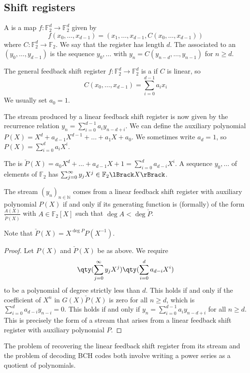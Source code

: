 \subsection{Shift registers}
\begin{definition}
    A  is a map $f \colon \mathbb F_2^d \to \mathbb F_2^d$ given by
    \[ f(x_0, \dots, x_{d-1}) = (x_1, \dots, x_{d-1}, C(x_0, \dots, x_{d-1})) \]
    where $C \colon \mathbb F_2^d \to \mathbb F_2$.
    We say that the register has length $d$.
    The  associated to an  $(y_0, \dots, y_{d-1})$ is the sequence $y_0, \dots$ with $y_n = C(y_{n-d}, \dots, y_{n-1})$ for $n \geq d$.
\end{definition}
\begin{definition}
    The general feedback shift register $f \colon \mathbb F_2^d \to \mathbb F_2^d$ is a  if $C$ is linear, so
    \[ C(x_0, \dots, x_{d-1}) = \sum_{i=0}^{d-1} a_i x_i \]
    We usually set $a_0 = 1$.
\end{definition}
The stream produced by a linear feedback shift register is now given by the recurrence relation $y_n = \sum_{i=0}^{d-1} a_i y_{n-d+i}$.
We can define the auxiliary polynomial $P(X) = X^d + a_{d-1} X^{d-1} + \dots + a_1 X + a_0$.
We sometimes write $a_d = 1$, so $P(X) = \sum_{i=0}^d a_i X^i$.
\begin{definition}
    The  is $\check{P}(X) = a_0 X^d + \dots + a_{d-1} X + 1 = \sum_{i=0}^d a_{d-i} X^i$.
    A sequence $y_0, \dots$ of elements of $\mathbb F_2$ has  $\sum_{j=0}^\infty y_j X^j \in \mathbb F_2\Brackets{X}$.
\end{definition}
\begin{theorem}
    The stream $(y_n)_{n \in \mathbb N}$ comes from a linear feedback shift register with auxiliary polynomial $P(X)$ if and only if its generating function is (formally) of the form $\frac{A(X)}{\check{P}(X)}$ with $A \in \mathbb F_2[X]$ such that $\deg A < \deg \check{P}$.
\end{theorem}
Note that $\check{P}(X) = X^{\deg P}P(X^{-1})$.
\begin{proof}
    Let $P(X)$ and $\check{P}(X)$ be as above.
    We require
    \[ \qty(\sum_{j=0}^\infty y_j X^j) \qty(\sum_{i=0}^d a_{d-i} X^i) \]
    to be a polynomial of degree strictly less than $d$.
    This holds if and only if the coefficient of $X^n$ in $G(X) \check{P}(X)$ is zero for all $n \geq d$, which is $\sum_{i=0}^d a_{d-i} y_{n-i} = 0$.
    This holds if and only if $y_n = \sum_{i=0}^{d-1} a_i y_{n-d + i}$ for all $n \geq d$.
    This is precisely the form of a stream that arises from a linear feedback shift register with auxiliary polynomial $P$.
\end{proof}
The problem of recovering the linear feedback shift register from its stream and the problem of decoding BCH codes both involve writing a power series as a quotient of polynomials.

